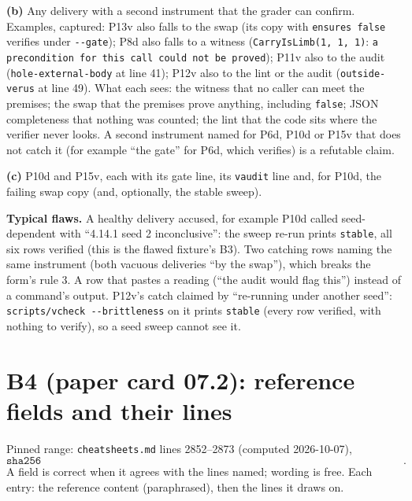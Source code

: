 \documentclass[11pt]{article}
\begin{document}
\textbf{(b)} Any delivery with a second instrument that the grader can
confirm. Examples, captured: P13v also falls to the swap (its copy with
\texttt{ensures false} verifies under \texttt{-{}-gate}); P8d also falls to a
witness (\texttt{CarryIsLimb(1, 1, 1)}: \texttt{a precondition for this call
could not be proved}); P11v also to the audit (\texttt{hole-external-body} at line 41);
P12v also to the lint or the audit (\texttt{outside-verus} at line 49). What each sees: the witness
that no caller can meet the premises; the swap that the premises prove anything,
including \texttt{false}; JSON completeness that nothing was counted; the lint
that the code sits where the verifier never looks. A second instrument named for
P6d, P10d or P15v that does not catch it (for example ``the gate'' for P6d,
which verifies) is a refutable claim.

\textbf{(c)} P10d and P15v, each with its gate line, its \texttt{vaudit} line
and, for P10d, the failing swap copy (and, optionally, the stable sweep).

\textbf{Typical flaws.} A healthy delivery accused, for example P10d called
seed-dependent with ``4.14.1 seed 2 inconclusive'': the sweep re-run prints
\texttt{stable}, all six rows verified (this is the flawed fixture's B3). Two
catching rows naming the same instrument (both vacuous deliveries ``by the
swap''), which breaks the form's rule 3. A row that pastes a reading
(``the audit would flag this'') instead of a command's output. P12v's catch
claimed by ``re-running under another seed'': \texttt{scripts/vcheck -{}-brittleness}
on it prints \texttt{stable} (every row verified, with nothing to verify), so
a seed sweep cannot see it.

\section*{B4 (paper card 07.2): reference fields and their lines}

Pinned range: \texttt{cheatsheets.md} lines 2852--2873 (computed 2026-10-07),
\[ \texttt{sha256 bb38472ca1ccae9a442c1ca25cbd87ffe7fabf66042aa9f48d4f9e4d5418410c}. \]
A field is correct when it agrees with the lines named; wording is free. Each
entry: the reference content (paraphrased), then the lines it draws on.
\end{document}
